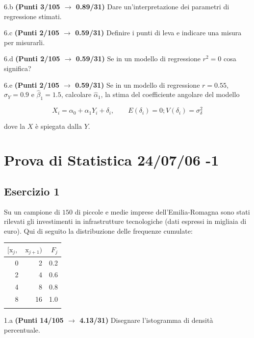 \documentclass[
  11pt,
]{book}
\theoremstyle{mytheoremstyle}
\theoremstyle{mydefstyle}
\begin{document}
6.b \textbf{(Punti 3/105 \(\rightarrow\) 0.89/31)} Dare un'interpretazione dei parametri di regressione stimati.

6.c \textbf{(Punti 2/105 \(\rightarrow\) 0.59/31)} Definire i punti di leva e indicare una misura per misurarli.

6.d \textbf{(Punti 2/105 \(\rightarrow\) 0.59/31)} Se in un modello di regressione \(r^2=0\) cosa significa?

6.e \textbf{(Punti 2/105 \(\rightarrow\) 0.59/31)} Se in un modello di regressione \(r=0.55\), \(\hat\sigma_Y=0.9\) e \(\hat\beta_1=1.5\), calcolare
\(\hat\alpha_1\), la stima del coefficiente angolare del modello

\[
X_i = \alpha_0+\alpha_1 Y_i + \delta_i, \qquad E(\delta_i)=0; V(\delta_i)=\sigma_\delta^2
\]

dove la \(X\) è spiegata dalla \(Y\).

\section{Prova di Statistica 24/07/06 -1}\label{prova-di-statistica-240706--1}

\subsection{Esercizio 1}\label{esercizio-1-41}

Su un campione di \(150\) di piccole e medie imprese dell'Emilia-Romagna sono stati rilevati gli investimenti in infrastrutture tecnologiche (dati espressi in migliaia di euro). Qui di seguito la distribuzione delle frequenze cumulate:

\begin{table}[H]
\centering
\begin{tabular}{rrr}
\toprule
$[\text{x}_j,$ & $\text{x}_{j+1})$ & $F_j$\\
\midrule
0 & 2 & 0.2\\
2 & 4 & 0.6\\
4 & 8 & 0.8\\
8 & 16 & 1.0\\
 &  & \\
\bottomrule
\end{tabular}
\end{table}

1.a \textbf{(Punti 14/105 \(\rightarrow\) 4.13/31)} Disegnare l'istogramma di densità percentuale.
\end{document}

